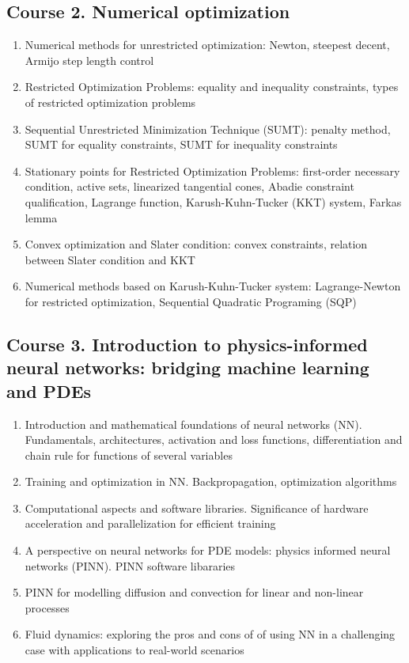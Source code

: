 \documentclass[letterpaper]{inzane_syllabus} %
\begin{document}
\subsection{Course 2. Numerical optimization}
\begin{enumerate}
  \item Numerical methods for unrestricted optimization:
  Newton, steepest decent, Armijo step length control
  \item Restricted Optimization Problems:
  equality and inequality constraints, types of restricted optimization problems
  \item Sequential Unrestricted Minimization Technique (SUMT):
  penalty method, SUMT for equality constraints, SUMT for inequality constraints
  \item Stationary points for Restricted Optimization Problems:
  first-order necessary condition, active sets, linearized tangential cones, Abadie constraint qualification,
  Lagrange function, Karush-Kuhn-Tucker (KKT) system, Farkas lemma
  \item Convex optimization and Slater condition:
  convex constraints, relation between Slater condition and KKT
  \item Numerical methods based on Karush-Kuhn-Tucker system:
  Lagrange-Newton for restricted optimization, Sequential Quadratic Programing (SQP)
\end{enumerate} 

\subsection{Course 3. Introduction to physics-informed neural networks: bridging machine learning and PDEs}
\begin{enumerate}
  \item Introduction and mathematical foundations of neural networks (NN). Fundamentals, architectures, activation and loss functions, differentiation and chain rule for functions of several variables
  \item Training and optimization in NN. Backpropagation, optimization algorithms
  \item Computational aspects and software libraries. Significance of hardware acceleration and parallelization for efficient training 
  \item A perspective on neural networks for PDE models: physics informed neural networks (PINN). PINN software libararies
  \item PINN for modelling diffusion and convection for linear and non-linear processes
  \item Fluid dynamics: exploring the pros and cons of of using NN in a challenging case with applications to real-world scenarios 
\end{enumerate}
\end{document}

